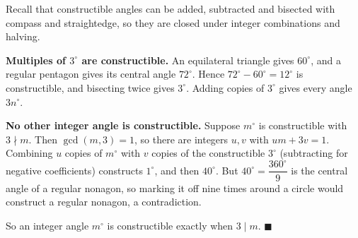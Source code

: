 Recall that constructible angles can be added, subtracted and bisected with compass and straightedge, so they are closed under integer combinations and halving.

\textbf{Multiples of $3^\circ$ are constructible.} An equilateral triangle gives $60^\circ$, and a regular pentagon gives its central angle $72^\circ$. Hence $72^\circ-60^\circ=12^\circ$ is constructible, and bisecting twice gives $3^\circ$. Adding copies of $3^\circ$ gives every angle $3n^\circ$.

\textbf{No other integer angle is constructible.} Suppose $m^\circ$ is constructible with $3\nmid m$. Then $\gcd(m,3)=1$, so there are integers $u,v$ with $um+3v=1$. Combining $u$ copies of $m^\circ$ with $v$ copies of the constructible $3^\circ$ (subtracting for negative coefficients) constructs $1^\circ$, and then $40^\circ$. But $40^\circ=\dfrac{360^\circ}{9}$ is the central angle of a regular nonagon, so marking it off nine times around a circle would construct a regular nonagon, a contradiction.

So an integer angle $m^\circ$ is constructible exactly when $3\mid m$. $\blacksquare$
